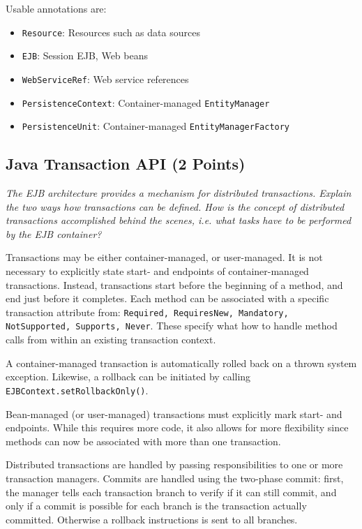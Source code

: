 \documentclass[a4paper,10pt]{article}
\begin{document}
Usable annotations are:

\begin{itemize}
    \item \lstinline|Resource|: Resources such as data sources
    \item \lstinline|EJB|: Session EJB, Web beans
    \item \lstinline|WebServiceRef|: Web service references
    \item \lstinline|PersistenceContext|: Container-managed \lstinline|EntityManager|
    \item \lstinline|PersistenceUnit|: Container-managed \lstinline|EntityManagerFactory|
\end{itemize}

\subsection{Java Transaction API (2 Points)}

\emph{
The EJB architecture provides a mechanism for distributed transactions. Explain the two ways how
transactions can be defined. How is the concept of distributed transactions accomplished behind the
scenes, i.e. what tasks have to be performed by the EJB container?}

\vspace{3mm}

Transactions may be either container-managed, or user-managed. It is not necessary to explicitly 
state start- and endpoints of container-managed transactions. Instead, transactions start
before the beginning of a method, and end just before it completes. Each method can
be associated with a specific transaction attribute from: \lstinline|Required, RequiresNew, Mandatory, NotSupported, Supports, Never|.
These specify what how to handle method calls from within an existing transaction context.

A container-managed transaction is automatically rolled back on a thrown system exception.
Likewise, a rollback can be initiated by calling \lstinline|EJBContext.setRollbackOnly()|.

Bean-managed (or user-managed) transactions must explicitly mark start- and endpoints.
While this requires more code, it also allows for more flexibility since methods can now
be associated with more than one transaction.

Distributed transactions are handled by passing responsibilities to one or more transaction
managers. Commits are handled using the two-phase commit: first, the manager tells each
transaction branch to verify if it can still commit, and only if a commit is possible
for each branch is the transaction actually committed. Otherwise a rollback instructions
is sent to all branches.
\end{document}
